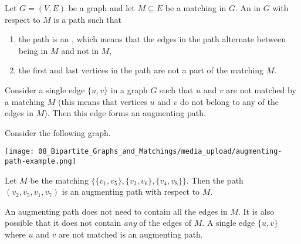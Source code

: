 \begin{flex}
\begin{definition} \label{definition:Augmenting-path}
Let $G = (V,E)$ be a graph and let $M \subseteq E$ be a matching in $G$. An  in $G$ with respect to $M$ is a path such that
\begin{enumerate}
   \item the path is an , which means that the edges in the path alternate between being in $M$ and not in $M$,
   \item the first and last vertices in the path are not a part of the matching $M$.
\end{enumerate}
\end{definition}

\begin{example}
Consider a single edge $\{u,v\}$ in a graph $G$ such that $u$ and $v$ are not matched by a matching $M$ (this means that vertices $u$ and $v$ do not belong to any of the edges in $M$). Then this edge forms an augmenting path.
\end{example}

\begin{example} \label{example:Augmenting-path-example}
Consider the following graph.
\begin{center}
    \texttt{[image: 08\_Bipartite\_Graphs\_and\_Matchings/media\_upload/augmenting-path-example.png]}
\end{center}
Let $M$ be the matching $\{\{v_1,v_5\}, \{v_3,v_6\}, \{v_4,v_8\}\}$. Then the path $(v_2,v_5,v_1,v_7)$ is an augmenting path with respect to $M$.
\end{example}
\end{flex}


\begin{note} \label{note:Edge-cases-for-augmenting-paths}
An augmenting path does not need to contain all the edges in $M$. It is also possible that it does not contain \emph{any} of the edges of $M$. A single edge $\{u, v\}$ where $u$ and $v$ are not matched is an augmenting path.
\end{note}


